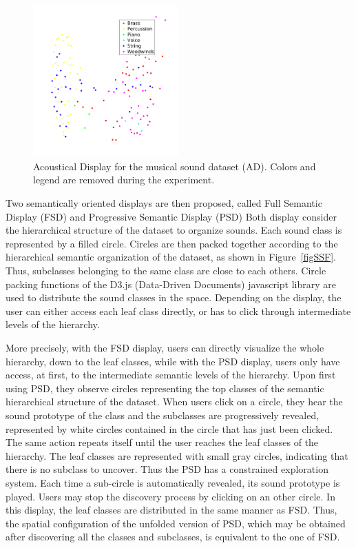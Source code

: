 \documentclass{aes2e}
\begin{document}
\begin{figure}[t]
\begin{center}
\includegraphics[width=0.5\textwidth]{gfx/music_mds.png} 
\end{center}
\caption{\label{figXP3music} Acoustical Display for the musical sound dataset (AD). Colors and legend are removed during the experiment.}
\end{figure}

Two semantically oriented displays are then proposed, called Full Semantic Display (FSD) and Progressive Semantic Display (PSD)%
Both display  consider the hierarchical structure of the dataset to organize sounds. Each sound class is represented by a filled circle. Circles are then packed together according to the hierarchical semantic organization of the dataset, as shown in Figure~\ref{figSSF}. Thus, subclasses belonging to the same class are close to each others. Circle packing functions of the D3.js (Data-Driven Documents) javascript library \cite{2011-d3} are used to distribute the sound classes in the space. Depending on the display, the user can either access each leaf class directly, or has to click through intermediate levels of the hierarchy. 

More precisely, with the FSD display, users can directly visualize the whole hierarchy, down to the leaf classes, while with the PSD display, users only have access, at first, to the intermediate semantic levels of the hierarchy. Upon first using PSD, they observe circles representing the top classes of the semantic hierarchical structure of the dataset. When users click on a circle, they hear the sound prototype of the class and the subclasses are progressively revealed, represented by white circles contained in the circle that has just been clicked. The same action repeats itself until the user reaches the leaf classes of the hierarchy. The leaf classes are represented with small gray circles, indicating that there is no subclass to uncover. Thus the PSD has a constrained exploration system. Each time a sub-circle is automatically revealed, its sound prototype is played. Users may stop the discovery process by clicking on an other circle. In this display, the leaf classes are distributed  in the same manner as FSD. Thus, the spatial configuration of the unfolded version of PSD, which may be obtained after discovering all the classes and subclasses, is equivalent to the one of FSD.
\end{document}
